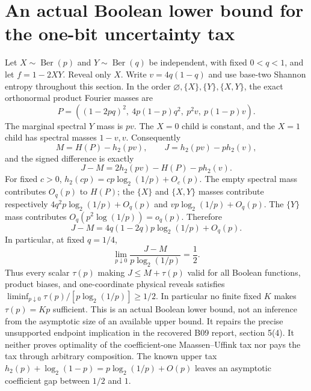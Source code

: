 \section{An actual Boolean lower bound for the one-bit uncertainty tax}
Let $X\sim\operatorname{Ber}(p)$ and $Y\sim\operatorname{Ber}(q)$ be
independent, with fixed $0<q<1$, and let $f=1-2XY$. Reveal only $X$.
Write $v=4q(1-q)$ and use base-two Shannon entropy throughout this
section. In the order $\varnothing,\{X\},\{Y\},\{X,Y\}$, the exact
orthonormal product Fourier masses are
\[
 P=((1-2pq)^2,\ 4p(1-p)q^2,\ p^2v,\ p(1-p)v).
\]
The marginal spectral $Y$ mass is $pv$. The $X=0$ child is constant,
and the $X=1$ child has spectral masses $1-v,v$. Consequently
\[
 M=H(P)-h_2(pv),\qquad J=h_2(pv)-p h_2(v),
\]
and the signed difference is exactly
\[
 J-M=2h_2(pv)-H(P)-p h_2(v).
\]
For fixed $c>0$, $h_2(cp)=cp\log_2(1/p)+O_c(p)$.
The empty spectral mass contributes $O_q(p)$ to $H(P)$; the
$\{X\}$ and $\{X,Y\}$ masses contribute respectively
$4q^2p\log_2(1/p)+O_q(p)$ and
$vp\log_2(1/p)+O_q(p)$. The $\{Y\}$ mass contributes
$O_q(p^2\log(1/p))=o_q(p)$. Therefore
\[
 J-M=4q(1-2q)p\log_2(1/p)+O_q(p).
\]
In particular, at fixed $q=1/4$,
\begin{equation}\label{a041:necessarytax}
 \lim_{p\downarrow0}\frac{J-M}{p\log_2(1/p)}=\frac12.
\end{equation}
Thus every scalar $\tau(p)$ making $J\le M+\tau(p)$ valid for all
Boolean functions, product biases, and one-coordinate physical reveals
satisfies $\liminf_{p\downarrow0}\tau(p)/[p\log_2(1/p)]\ge1/2$.
In particular no finite fixed $K$ makes $\tau(p)=Kp$ sufficient.
This is an actual Boolean lower bound, not an inference from the
asymptotic size of an available upper bound. It repairs the precise
unsupported endpoint implication in the recovered B09 report, section
5(4). It neither proves optimality of the coefficient-one
Maassen--Uffink tax nor pays the tax through arbitrary composition.
The known upper tax
$h_2(p)+\log_2(1-p)=p\log_2(1/p)+O(p)$ leaves an asymptotic
coefficient gap between $1/2$ and $1$.

